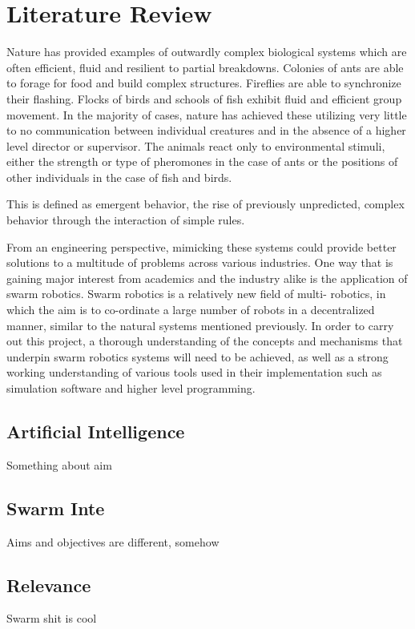 \chapter{Literature Review}
\label{chap:LiteratureReview}

Nature has provided examples of outwardly complex biological systems which are often efficient, fluid
and resilient to partial breakdowns. Colonies of ants are able to forage for food and build complex
structures. Fireflies are able to synchronize their flashing. Flocks of birds and schools of fish exhibit fluid
and efficient group movement. In the majority of cases, nature has achieved these utilizing very little to
no communication between individual creatures and in the absence of a higher level director or supervisor.
The animals react only to environmental stimuli, either the strength or type of pheromones in the case of
ants or the positions of other individuals in the case of fish and birds.

This is defined as emergent behavior, the rise of previously unpredicted, complex behavior through the
interaction of simple rules.

From an engineering perspective, mimicking these systems could provide better solutions to a multitude
of problems across various industries. One way that is gaining major interest from academics and the
industry alike is the application of swarm robotics. Swarm robotics is a relatively new field of multi-
robotics, in which the aim is to co-ordinate a large number of robots in a decentralized manner, similar to
the natural systems mentioned previously. In order to carry out this project, a thorough understanding of
the concepts and mechanisms that underpin swarm robotics systems will need to be achieved, as well as
a strong working understanding of various tools used in their implementation such as simulation software
and higher level programming.

\section{Artificial Intelligence}
Something about aim

\section{Swarm Inte}
Aims and objectives are different, somehow

\section{Relevance}
Swarm shit is cool